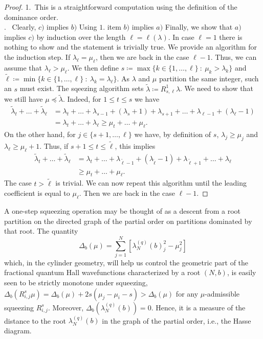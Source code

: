 \documentclass[letterpaper, DIV=17]{scrartcl}
\numberwithin{equation}{section}
\theoremstyle{definition}
\begin{document}
		\begin{proof}
		1.~This is a straightforward computation using the definition of the dominance order.\\
		.~ Clearly, $c)$ implies $b)$ Using $1.$ item $b)$ implies $a)$  Finally, we show that $a)$ implies $c)$ by induction over the length $\ell=\ell(\lambda)$. In case $\ell=1$ there is nothing to show and the statement is trivially true. We provide an algorithm for the induction step. If $\lambda_\ell=\mu_\ell$, then we are back in the case $\ell-1$. Thus, we can assume that $\lambda_\ell>\mu_\ell$. We then define
$ s \coloneqq \max\{k\in \{1, \dots, \ell\} \ : \ \mu_k > \lambda_k\} $  and 	$\tilde{\ell} \coloneqq \min \{ k\in \{1, \dots, \ell\} \ : \ \lambda_k = \lambda_\ell\} $. 
As $\lambda$ and $\mu$ partition the same integer, such an $s$ must exist. The sqeezing algorithm sets $\tilde{\lambda} \coloneqq R_{s,\ell}^1 \lambda$. We need to show that we still have $\mu \preceq \tilde{\lambda}$. 	
Indeed, for $1\leq t \leq s$ we have
				\begin{align*}
					\tilde{\lambda}_t + \dots + \tilde{\lambda}_\ell &= \lambda_t + \dots + \lambda_{s-1}+ (\lambda_s+1) + \lambda_{s+1} + \dots + \lambda_{\ell-1}+ (\lambda_\ell-1) \\
					&= \lambda_t + \dots + \lambda_\ell \geq \mu_t + \dots + \mu_\ell.  
				\end{align*}
				On the other hand, for $j\in \{s+1, \dots, \ell\}$ we have, by definition of $s$, $\lambda_j\geq \mu_j$ and $\lambda_\ell\geq \mu_\ell+1$. Thus, if $s+1\leq t \leq \tilde{\ell}$, this implies
				\begin{align*}
	\tilde{\lambda}_t + \dots + \tilde{\lambda}_\ell
	&= \lambda_t + \dots + \lambda_{\tilde{\ell}-1}+ (\lambda_{\tilde{\ell}}-1)+\lambda_{\tilde{\ell}+1}+\dots +\lambda_\ell \\
	&\geq\mu_t + \dots + \mu_\ell.
\end{align*}
The case $t>\tilde{\ell}$ is trivial.
We can now repeat this algorithm until the leading coefficient is equal to $\mu_\ell$. Then we are back in the case $\ell-1$.
		\end{proof}
		
A one-step squeezing operation may be thought of as a descent from a root partition on the directed graph of the partial order on partitions dominated by that root. 
The quantity
	\begin{equation} \label{definition Delta}
			\Delta_b(\mu) = \sum_{j=1}^{N} \left[ \lambda_N^{(q)}(b)_j^2-\mu_j^2\right]
		\end{equation}
which, in the cylinder geometry, will help us control the geometric part of the fractional quantum Hall wavefunctions characterized by a root $(N,b) $, is easily seen to be strictly monotone under squeezing, 
$				\Delta_b(R_{i,j}^s \mu) = \Delta_b(\mu) +2s (\mu_j-\mu_i -s)> \Delta_b(\mu) $ for any $\mu $-admissible squeezing $R_{i,j}^{s}$. Moreover, $ \Delta_b( \lambda_N^{(q)}(b)) = 0 $. 
Hence, it is a measure of the distance to the root $  \lambda_N^{(q)}(b) $ in the graph of the partial order, i.e., the Hasse diagram. 
\end{document}
